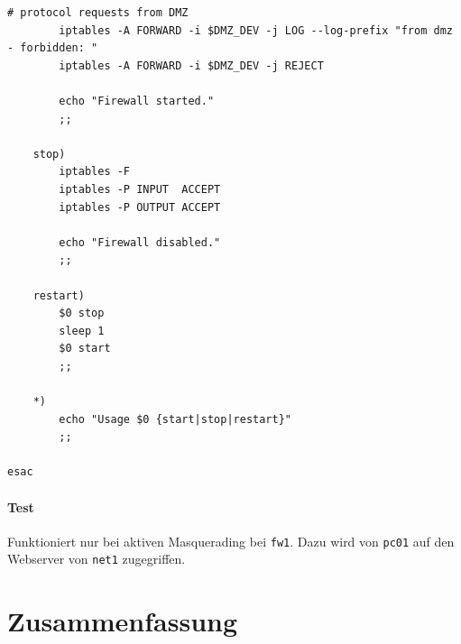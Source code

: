 \begin{lstlisting}[label=lst:masq,caption={Basisskript interne Firewall.}]
        # protocol requests from DMZ
        iptables -A FORWARD -i $DMZ_DEV -j LOG --log-prefix "from dmz - forbidden: "
        iptables -A FORWARD -i $DMZ_DEV -j REJECT

        echo "Firewall started."
        ;;

    stop)
        iptables -F
        iptables -P INPUT  ACCEPT
        iptables -P OUTPUT ACCEPT

        echo "Firewall disabled."
        ;;

    restart)
        $0 stop
        sleep 1
        $0 start
        ;;

    *)
        echo "Usage $0 {start|stop|restart}"
        ;;

esac
\end{lstlisting}

\paragraph{Test} Funktioniert nur bei aktiven Masquerading bei {\tt fw1}.
Dazu wird von {\tt pc01} auf den Webserver von {\tt net1} zugegriffen.

\section{Zusammenfassung}

